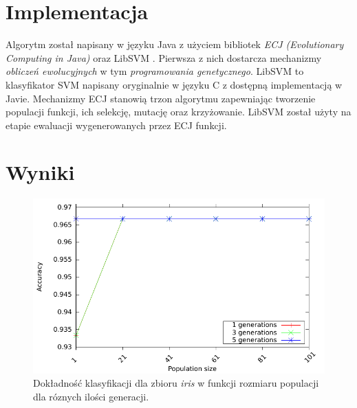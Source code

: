 \documentclass{article}
\begin{document}
\section{Implementacja}
Algorytm został napisany w języku Java z użyciem bibliotek \textit{ECJ (Evolutionary Computing in Java)} \cite{sean_ecj_2010} oraz LibSVM \cite{chang_libsvm:_2011}. Pierwsza z nich dostarcza mechanizmy \textit{obliczeń ewolucyjnych} w tym \textit{programowania genetycznego}.
LibSVM to klasyfikator SVM napisany oryginalnie w języku C z dostępną implementacją w Javie.
Mechanizmy ECJ stanowią trzon algorytmu zapewniając tworzenie populacji funkcji, ich selekcję, mutację oraz krzyżowanie. LibSVM został użyty na etapie ewaluacji wygenerowanych przez ECJ funkcji.
	
	
	
	


\section{Wyniki}
	\begin{figure}[h]
		\includegraphics[scale=0.90]{../ecj-svm/results/processed/accuracy-iris}
		\caption{Dokładność klasyfikacji dla zbioru \emph{iris} w funkcji rozmiaru populacji dla róznych ilości generacji.\label{fig:acc-iris}}
	\end{figure}
	
\end{document}
